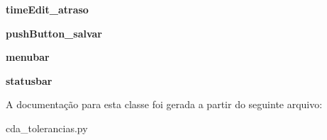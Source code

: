 \begin{DoxyCompactItemize}
\item 
\hypertarget{classcda__tolerancias_1_1Ui__Tolerancias__Window_a11ffe9054d6d62a371364bc1abe88221}{{\bfseries time\-Edit\-\_\-atraso}}\label{classcda__tolerancias_1_1Ui__Tolerancias__Window_a11ffe9054d6d62a371364bc1abe88221}

\item 
\hypertarget{classcda__tolerancias_1_1Ui__Tolerancias__Window_a88dc4bf5169a202149e94b8c0eded5c7}{{\bfseries push\-Button\-\_\-salvar}}\label{classcda__tolerancias_1_1Ui__Tolerancias__Window_a88dc4bf5169a202149e94b8c0eded5c7}

\item 
\hypertarget{classcda__tolerancias_1_1Ui__Tolerancias__Window_a6bff71d10d4634e41cf8e68484cb09f0}{{\bfseries menubar}}\label{classcda__tolerancias_1_1Ui__Tolerancias__Window_a6bff71d10d4634e41cf8e68484cb09f0}

\item 
\hypertarget{classcda__tolerancias_1_1Ui__Tolerancias__Window_ab564e4b0f282e03e007e302aa0a9dbcd}{{\bfseries statusbar}}\label{classcda__tolerancias_1_1Ui__Tolerancias__Window_ab564e4b0f282e03e007e302aa0a9dbcd}

\end{DoxyCompactItemize}


\-A documentação para esta classe foi gerada a partir do seguinte arquivo\-:\begin{DoxyCompactItemize}
\item 
cda\-\_\-tolerancias.\-py\end{DoxyCompactItemize}
